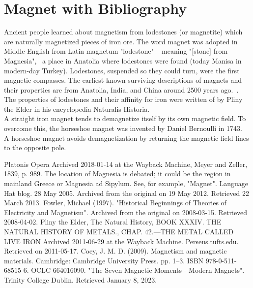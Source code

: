 \documentclass[12pt]{article}
\begin{document}
\newpage
\section{Magnet with Bibliography}

\begin{normalsize}
	Ancient people learned about magnetism from lodestones (or magnetite) which are naturally magnetized pieces of iron ore. The word magnet was adopted in Middle English from Latin magnetum "lodestone" ~\cite{1} meaning "[stone] from Magnesia",~\cite{2} a place in Anatolia where lodestones were found (today Manisa in modern-day Turkey). Lodestones, suspended so they could turn, were the first magnetic compasses. The earliest known surviving descriptions of magnets and their properties are from Anatolia, India, and China around 2500 years ago.~\cite{3}. The properties of lodestones and their affinity for iron were written of by Pliny the Elder in his encyclopedia Naturalis Historia.~\cite{4}\\	
	A straight iron magnet tends to demagnetize itself by its own magnetic field. To overcome this, the horseshoe magnet was invented by Daniel Bernoulli in 1743.~\cite{5}~\cite{6} A horseshoe magnet avoids demagnetization by returning the magnetic field lines to the opposite pole.

\begin{thebibliography} {}
 Platonis Opera Archived 2018-01-14 at the Wayback Machine, Meyer and Zeller, 1839, p. 989.
 The location of Magnesia is debated; it could be the region in mainland Greece or Magnesia ad Sipylum. See, for example, "Magnet". Language Hat blog. 28 May 2005. Archived from the original on 19 May 2012. Retrieved 22 March 2013.
 Fowler, Michael (1997). "Historical Beginnings of Theories of Electricity and Magnetism". Archived from the original on 2008-03-15. Retrieved 2008-04-02.
 Pliny the Elder, The Natural History, BOOK XXXIV. THE NATURAL HISTORY OF METALS., CHAP. 42.—THE METAL CALLED LIVE IRON Archived 2011-06-29 at the Wayback Machine. Perseus.tufts.edu. Retrieved on 2011-05-17.
 Coey, J. M. D. (2009). Magnetism and magnetic materials. Cambridge: Cambridge University Press. pp. 1–3. ISBN 978-0-511-68515-6. OCLC 664016090.
 "The Seven Magnetic Moments - Modern Magnets". Trinity College Dublin. Retrieved January 8, 2023.


\end{thebibliography}
\end{normalsize}
\end{document}
